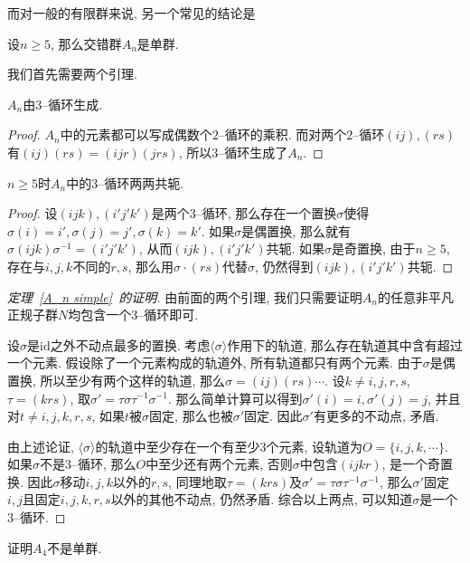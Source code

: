而对一般的有限群来说, 另一个常见的结论是
\begin{thm}\label{A_n simple}
    设$n\geq 5$, 那么交错群$A_n$是单群.
\end{thm}

我们首先需要两个引理.
\begin{lem}
    $A_n$由$3$--循环生成.
\end{lem}
\begin{proof}
    $A_n$中的元素都可以写成偶数个$2$--循环的乘积.
    而对两个$2$--循环$(ij),(rs)$有$(ij)(rs)=(ijr)(jrs)$, 所以$3$--循环生成了$A_n$.
\end{proof}

\begin{lem}
    $n\geq 5$时$A_n$中的$3$--循环两两共轭.
\end{lem}
\begin{proof}
    设$(ijk),(i'j'k')$是两个$3$--循环, 那么存在一个置换$\sigma$使得$\sigma(i)=i',\sigma(j)=j',\sigma(k)=k'$.
    如果$\sigma$是偶置换, 那么就有$\sigma(ijk)\sigma^{-1}=(i'j'k')$, 从而$(ijk),(i'j'k')$共轭.
    如果$\sigma$是奇置换, 由于$n\geq 5$, 存在与$i,j,k$不同的$r,s$, 那么用$\sigma\cdot(rs)$代替$\sigma$, 仍然得到$(ijk),(i'j'k')$共轭.
\end{proof}

\begin{proof}[定理~\ref{A_n simple}~的证明]
    由前面的两个引理, 我们只需要证明$A_n$的任意非平凡正规子群$N$均包含一个$3$--循环即可.

    设$\sigma$是$\mathrm{id}$之外不动点最多的置换.
    考虑$\langle\sigma\rangle$作用下的轨道, 那么存在轨道其中含有超过一个元素.
    假设除了一个元素构成的轨道外, 所有轨道都只有两个元素.
    由于$\sigma$是偶置换, 所以至少有两个这样的轨道, 那么$\sigma=(ij)(rs)\cdots$.
    设$k\neq i,j,r,s$, $\tau=(krs)$, 取$\sigma'=\tau\sigma\tau^{-1}\sigma^{-1}$.
    那么简单计算可以得到$\sigma'(i)=i,\sigma'(j)=j$, 并且对$t\neq i,j,k,r,s$, 如果$t$被$\sigma$固定, 那么也被$\sigma'$固定.
    因此$\sigma'$有更多的不动点, 矛盾.

    由上述论证, $\langle\sigma\rangle$的轨道中至少存在一个有至少$3$个元素, 设轨道为$O=\{i,j,k,\cdots\}$.
    如果$\sigma$不是$3$--循环, 那么$O$中至少还有两个元素, 否则$\sigma$中包含$(ijkr)$, 是一个奇置换.
    因此$\sigma$移动$i,j,k$以外的$r,s$, 同理地取$\tau=(krs)$及$\sigma'=\tau\sigma\tau^{-1}\sigma^{-1}$, 那么$\sigma'$固定$i,j$且固定$i,j,k,r,s$以外的其他不动点, 仍然矛盾.
    综合以上两点, 可以知道$\sigma$是一个$3$--循环.
\end{proof}

\begin{ex}
    证明$A_4$不是单群.
\end{ex}

